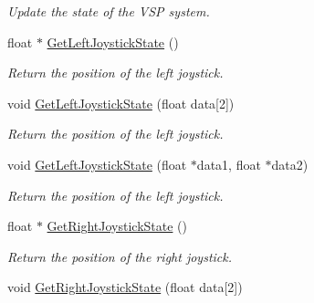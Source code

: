 \begin{DoxyCompactItemize}
\begin{DoxyCompactList}\small\item\em Update the state of the VSP system. \item\end{DoxyCompactList}\item 
\hypertarget{classvtkVSP_a18aefac07bea39778d9965de22665111}{
float $\ast$ \hyperlink{classvtkVSP_a18aefac07bea39778d9965de22665111}{GetLeftJoystickState} ()}
\label{classvtkVSP_a18aefac07bea39778d9965de22665111}

\begin{DoxyCompactList}\small\item\em Return the position of the left joystick. \item\end{DoxyCompactList}\item 
\hypertarget{classvtkVSP_a706f76c150a0de378fbf86e9bc44e0f4}{
void \hyperlink{classvtkVSP_a706f76c150a0de378fbf86e9bc44e0f4}{GetLeftJoystickState} (float data\mbox{[}2\mbox{]})}
\label{classvtkVSP_a706f76c150a0de378fbf86e9bc44e0f4}

\begin{DoxyCompactList}\small\item\em Return the position of the left joystick. \item\end{DoxyCompactList}\item 
\hypertarget{classvtkVSP_a55af41bd4362fe00025d9a90aea7f088}{
void \hyperlink{classvtkVSP_a55af41bd4362fe00025d9a90aea7f088}{GetLeftJoystickState} (float $\ast$data1, float $\ast$data2)}
\label{classvtkVSP_a55af41bd4362fe00025d9a90aea7f088}

\begin{DoxyCompactList}\small\item\em Return the position of the left joystick. \item\end{DoxyCompactList}\item 
\hypertarget{classvtkVSP_a4ec2368aca2a41fa84ac3216c7bc95cd}{
float $\ast$ \hyperlink{classvtkVSP_a4ec2368aca2a41fa84ac3216c7bc95cd}{GetRightJoystickState} ()}
\label{classvtkVSP_a4ec2368aca2a41fa84ac3216c7bc95cd}

\begin{DoxyCompactList}\small\item\em Return the position of the right joystick. \item\end{DoxyCompactList}\item 
\hypertarget{classvtkVSP_ac1791508a42682b6574ffb8d01ac0586}{
void \hyperlink{classvtkVSP_ac1791508a42682b6574ffb8d01ac0586}{GetRightJoystickState} (float data\mbox{[}2\mbox{]})}
\label{classvtkVSP_ac1791508a42682b6574ffb8d01ac0586}


\end{DoxyCompactItemize}
